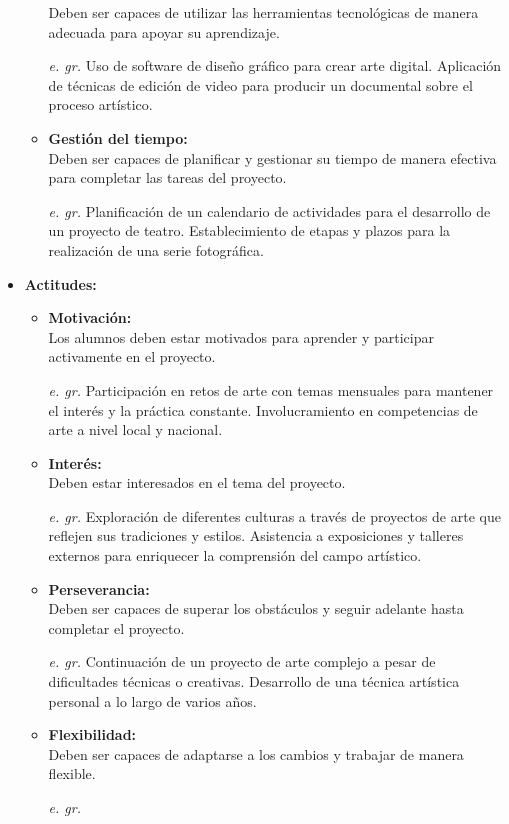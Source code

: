 \begin{itemize}
\begin{itemize}
         Deben ser capaces de utilizar las herramientas tecnológicas de manera adecuada para apoyar su aprendizaje.
         \item[\textit{e. gr.}]
         Uso de software de diseño gráfico para crear arte digital. Aplicación de técnicas de edición de video para producir un documental sobre el proceso artístico.
         \item \textbf{Gestión del tiempo:}\\
         Deben ser capaces de planificar y gestionar su tiempo de manera efectiva para completar las tareas del proyecto.
         \item[\textit{e. gr.}]Planificación de un calendario de actividades para el desarrollo de un proyecto de teatro. Establecimiento de etapas y plazos para la realización de una serie fotográfica.
    \end{itemize}
    \item \textbf{Actitudes:}
    \begin{itemize}
        \item \textbf{Motivación:}\\
        Los alumnos deben estar motivados para aprender y participar activamente en el proyecto.
        \item[\textit{e. gr.}] Participación en retos de arte con temas mensuales para mantener el interés y la práctica constante. Involucramiento en competencias de arte a nivel local y nacional.
        \item \textbf{Interés:}\\
        Deben estar interesados en el tema del proyecto.
        \item[\textit{e. gr.}] Exploración de diferentes culturas a través de proyectos de arte que reflejen sus tradiciones y estilos. Asistencia a exposiciones y talleres externos para enriquecer la comprensión del campo artístico.
       \item \textbf{Perseverancia: }\\
       Deben ser capaces de superar los obstáculos y seguir adelante hasta completar el proyecto.
       \item[\textit{e. gr.}]Continuación de un proyecto de arte complejo a pesar de dificultades técnicas o creativas. Desarrollo de una técnica artística personal a lo largo de varios años.
      \item \textbf{Flexibilidad: } \\
      Deben ser capaces de adaptarse a los cambios y trabajar de manera flexible.
      \item[\textit{e. gr.}] 

\end{itemize}
\end{itemize}
